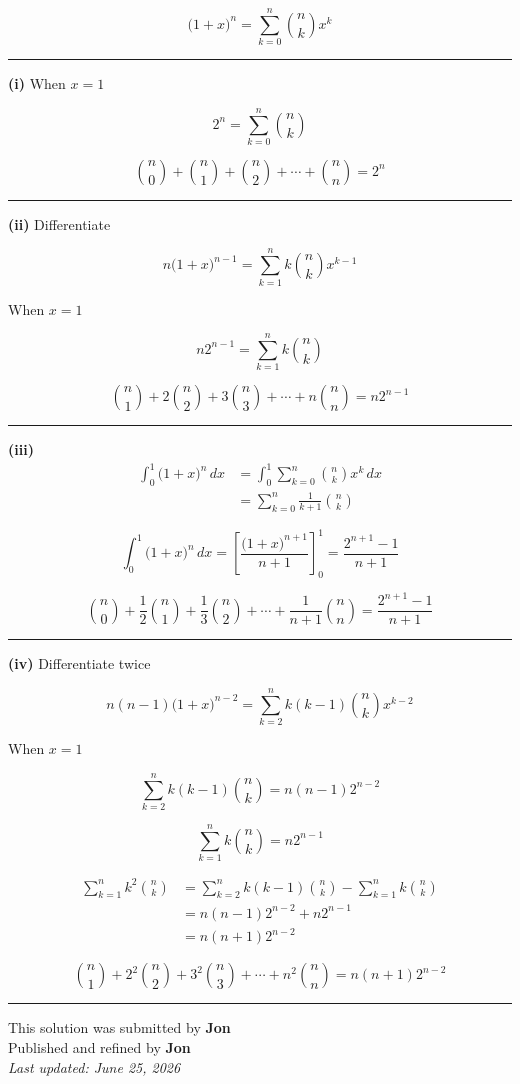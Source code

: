 \documentclass[12pt]{article}
\begin{document}
\newcommand{\ds}{\displaystyle}


$$\bigl(1+x\bigr)^n=\sum_{k=0}^{n}\binom{n}{k}x^k$$

\bigskip\hrule\bigskip

\textbf{(i)} When $x=1$

$$2^n=\sum_{k=0}^{n}\binom{n}{k}$$

$$\binom{n}{0}+\binom{n}{1}+\binom{n}{2}+\cdots+\binom{n}{n}=2^n$$

\bigskip\hrule\bigskip

\textbf{(ii)} Differentiate

$$n\bigl(1+x\bigr)^{n-1}=\sum_{k=1}^{n}k\binom{n}{k}x^{k-1}$$

When $x=1$

$$n2^{n-1}=\sum_{k=1}^{n}k\binom{n}{k}$$

$$\binom{n}{1}+2\binom{n}{2}+3\binom{n}{3}+\cdots+n\binom{n}{n}=n2^{n-1}$$

\bigskip\hrule\bigskip

\textbf{(iii)}
\begin{align*}
\int_0^1\bigl(1+x\bigr)^n\,dx
&=\int_0^1\sum_{k=0}^{n}\binom{n}{k}x^k\,dx\\
&=\sum_{k=0}^{n}\frac1{k+1}\binom{n}{k}
\end{align*}

$$\int_0^1\bigl(1+x\bigr)^n\,dx=\left[\frac{\bigl(1+x\bigr)^{n+1}}{n+1}\right]_0^1=\frac{2^{n+1}-1}{n+1}$$

$$\binom{n}{0}+\frac12\binom{n}{1}+\frac13\binom{n}{2}+\cdots+\frac1{n+1}\binom{n}{n}=\frac{2^{n+1}-1}{n+1}$$

\bigskip\hrule\bigskip

\textbf{(iv)} Differentiate twice

$$n(n-1)\bigl(1+x\bigr)^{n-2}=\sum_{k=2}^{n}k(k-1)\binom{n}{k}x^{k-2}$$

When $x=1$

$$\sum_{k=2}^{n}k(k-1)\binom{n}{k}=n(n-1)2^{n-2}$$


$$\sum_{k=1}^{n}k\binom{n}{k}=n2^{n-1}$$


\begin{align*}
\sum_{k=1}^{n}k^2\binom{n}{k}&=\sum_{k=2}^{n}k(k-1)\binom{n}{k}-\sum_{k=1}^{n}k\binom{n}{k}\\
&=n(n-1)2^{n-2}+n2^{n-1}\\
&=n(n+1)2^{n-2}
\end{align*}

$$\binom{n}{1}+2^2\binom{n}{2}+3^2\binom{n}{3}+\cdots+n^2\binom{n}{n}=n(n+1)2^{n-2}$$

\bigskip
\hrule
\begin{center}
    This solution was submitted by \textbf{Jon}\\[4pt]
    Published and refined by \textbf{Jon}\\[8pt]
    \textit{Last updated: June 25, 2026}
\end{center}
\end{document}
